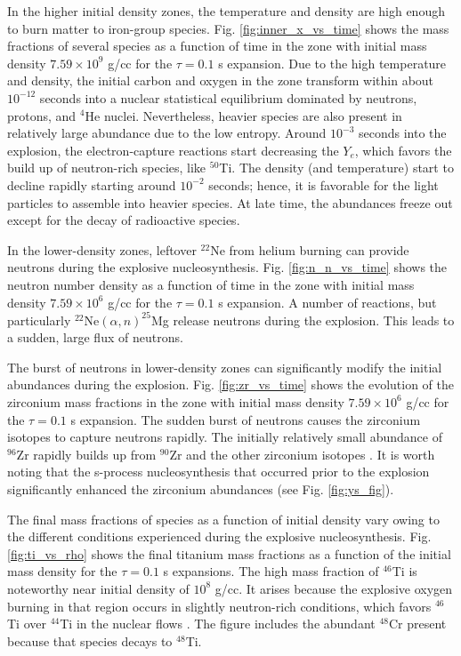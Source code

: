 \documentclass[preprint]{revtex4-2}
\begin{document}
In the higher initial density zones, the temperature and density are high
enough to burn matter to iron-group species.  Fig. \ref{fig:inner_x_vs_time}
shows the mass fractions of several species as a function of time
in the zone with initial mass density $7.59 \times 10^9$ g/cc for the
$\tau = 0.1$ s expansion.
Due to the high temperature and density, the
initial carbon and oxygen in the zone transform within about $10^{-12}$
seconds into a nuclear statistical equilibrium dominated by neutrons,
protons, and $^4$He nuclei.  Nevertheless, heavier species are also
present in relatively large abundance due to the low entropy.
Around $10^{-3}$ seconds into the explosion, the electron-capture
reactions start decreasing the $Y_e$, which favors the build up of
neutron-rich species, like $^{50}$Ti.  The density (and temperature)
start to decline rapidly starting around $10^{-2}$ seconds; hence,
it is favorable for the light particles to assemble into heavier species.
At late time, the abundances freeze out except for the decay of
radioactive species.

In the lower-density zones, leftover $^{22}$Ne from helium burning can provide
neutrons during the explosive nucleosynthesis.  Fig. \ref{fig:n_n_vs_time}
shows the neutron number density as a function of time in the zone with
initial mass density $7.59 \times 10^6$ g/cc for the $\tau = 0.1$ s expansion.
A number of reactions, but particularly
$^{22}$Ne$(\alpha, n)^{25}$Mg release neutrons during the explosion.
This leads to a sudden, large flux of neutrons.

The burst of neutrons in lower-density zones can significantly modify the
initial abundances during the explosion.  Fig. \ref{fig:zr_vs_time}
shows the evolution of the zirconium mass fractions
in the zone with initial mass density $7.59 \times 10^6$ g/cc for the
$\tau = 0.1$ s expansion.
The sudden burst of neutrons causes the zirconium
isotopes to capture neutrons rapidly.  The initially relatively small
abundance of $^{96}$Zr rapidly builds up from $^{90}$Zr and the other
zirconium isotopes \cite{2011ApJ...739...93T}.
It is worth noting that the s-process nucleosynthesis
that occurred prior to the explosion significantly enhanced the zirconium
abundances (see Fig. \ref{fig:ys_fig}).

The final mass fractions of species as a function of initial density vary
owing to the different conditions experienced during the explosive
nucleosynthesis.  Fig. \ref{fig:ti_vs_rho} shows the final titanium
mass fractions as a function of the initial mass density for the $\tau = 0.1$
s expansions.
The high mass fraction
of $^{46}$Ti is noteworthy near initial density of $10^8$ g/cc.  It arises
because the explosive oxygen burning in that region occurs in slightly
neutron-rich conditions, which favors $^{46}$Ti over $^{44}$Ti in the
nuclear flows \cite{1973ApJS...26..231W}.
The figure includes the abundant $^{48}$Cr present
because that species decays to $^{48}$Ti.
\end{document}
